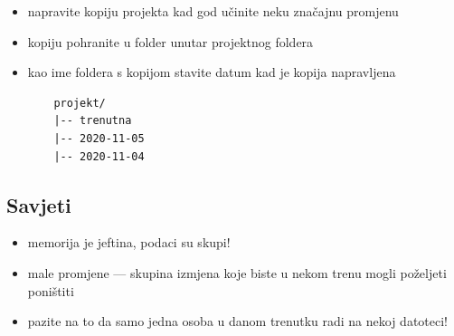 \documentclass[aspectratio=169]{beamer}
\begin{document}
\begin{frame}[fragile]
    \begin{itemize}
        \setlength{\itemsep}{2em}

        \item napravite kopiju projekta kad god učinite neku značajnu promjenu

        \pause

        \item kopiju pohranite u folder unutar projektnog foldera

        \item kao ime foldera s kopijom stavite datum kad je kopija napravljena

        \pause

        \begin{lstlisting}
    projekt/
    |-- trenutna
    |-- 2020-11-05
    |-- 2020-11-04
        \end{lstlisting}
    \end{itemize}
\end{frame}

\subsection{Savjeti}

\begin{frame}
    \begin{itemize}
        \setlength{\itemsep}{2em}

        \item memorija je jeftina, podaci su skupi!

        \pause

        \item male promjene --- skupina izmjena koje biste u nekom trenu
            mogli poželjeti poništiti

        \pause

        \item pazite na to da samo jedna osoba u danom trenutku radi na nekoj
            datoteci!
    \end{itemize}
\end{frame}
\end{document}

